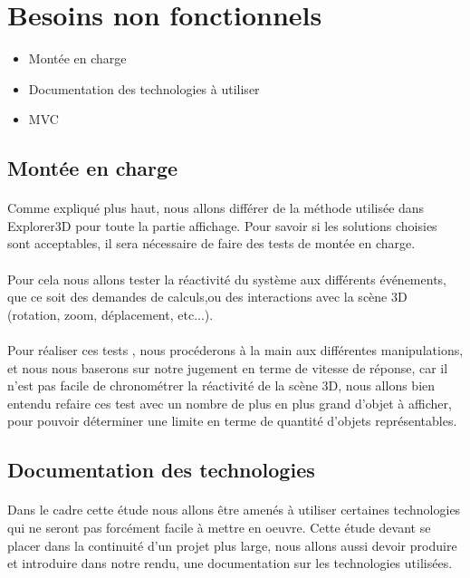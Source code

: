 \section{Besoins non fonctionnels}
\begin{itemize}
\item Montée en charge
\item Documentation des technologies à utiliser
\item MVC
\end{itemize}
\subsection{Montée en charge}
\paragraph{} Comme expliqué plus haut, nous allons différer de la méthode utilisée dans Explorer3D pour toute la partie affichage. Pour savoir si les solutions choisies sont acceptables, il sera nécessaire de faire des tests de montée en charge.

\paragraph{} Pour cela nous allons tester la réactivité du système aux différents événements, que ce soit des demandes de calculs,ou des interactions avec la scène 3D (rotation, zoom, déplacement, etc...).

\paragraph{} Pour réaliser ces tests , nous procéderons à la main aux différentes manipulations, et nous nous baserons sur notre jugement en terme de vitesse de réponse, car il n'est pas facile de chronométrer la réactivité de la scène 3D, nous allons bien entendu refaire ces test avec un nombre de plus en plus grand d'objet à afficher, pour pouvoir déterminer une limite en terme de quantité d'objets représentables.

\newpage

\subsection{Documentation des technologies}
\paragraph{} Dans le cadre cette étude nous allons être amenés à utiliser certaines technologies qui ne seront pas forcément facile à mettre en oeuvre. Cette étude devant se placer dans la continuité d'un projet plus large, nous allons aussi devoir produire et introduire dans notre rendu, une documentation sur les technologies utilisées.

